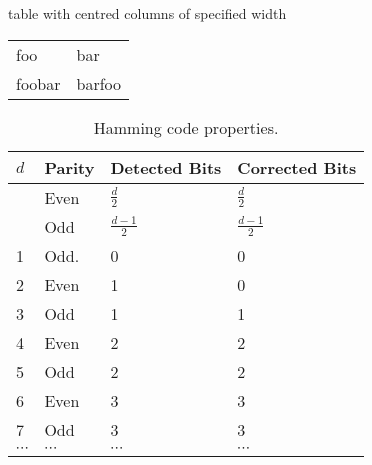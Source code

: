 \documentclass{article}
\begin{document}
\begin{center}
table with centred columns of specified width
\bigskip

\begin{tabular}{K{2cm}K{2cm}}
\hline
foo & bar \\
foobar & barfoo \\
\hline
\end{tabular}
\end{center}

\bigskip
\begin{table}[htp]
 \caption{Hamming code properties.}
\begin{center}
\begin{tabular}{||K{1cm}|K{3cm}|K{3cm}|K{3cm}||}
\hline\hline 
$d$ &Parity &Detected Bits &Corrected Bits             \\ \hline
       &Even  & $\frac{d}{2}$ & $\frac{d}{2}$                \\
       &Odd   & $\frac{d-1}{2}$ & $\frac{d-1}{2}$          \\\hline{}   &Odd.  &  0                     &      0                           \\
  2   &Even &  1                     &       0                          \\
  3   &Odd  &  1                     &       1                          \\
  4   &Even &  2                     &       2                          \\
  5   &Odd  &  2                     &       2                          \\
  6   &Even &  3                     &       3                          \\
  7   &Odd  &  3                     &       3                          \\
$\cdots$&$\cdots$&$\cdots$&$\cdots$ \\ \hline\hline
\end{tabular}
\end{center}
 \label{tab:HamCodeProps}
\end{table}%

\bigskip
\end{document}
